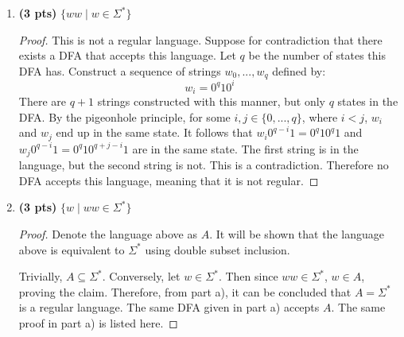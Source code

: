 \documentclass[11pt]{article}
\begin{document}
\begin{enumerate}[label=\textbf{Q\arabic*.}]
\begin{enumerate}[label=\textit{\alph*)}]
	\begin{proof}
		This is not regular. Suppose for contradiction that this language was regular. Then there would be a DFA associated with this language. Let \(q\) be the number of states in this DFA, and let \(q_0\) denote the initial state. Define the following strings:
		\[
			w_i = 0^q 1 0^{i} \text{, for } i \in \{0, 1, 2, ..., q\}
		\]
		Notice that there are \(q+1\) strings in total. By the pigeonhole principle, at least 2 \(w_i, w_j\) will be in the same state \(q_c\), \(i < j\), that is, \(\delta (q_0, w_i) = \delta (q_0, w_j) = q_c\). It follows that \(\delta (q_0, w_i 0^{q-i}) = \delta (q_0, w_j 0^{q-i})\). But notice that
		\[
			w_i = 0^q 1 0^q \text{ and } w_j = 0^q 1 0^{q+j-i} \text{.} 
		\]
		It can be seen that \(w_i\) is a palindrome and should be accepted, but because \(q + j - i \neq q\), \(w_j\) is not a palindrome, which contradicts the fact that \(w_i\) and \(w_j\) are in the same state.

	\end{proof}
	\item \textbf{(3 pts)} $ \{ww \mid w \in \Sigma^*  \} $
	
	\begin{proof}
		This is not a regular language. Suppose for contradiction that there exists a DFA that accepts this language. Let \(q\) be the number of states this DFA has. Construct a sequence of strings \(w_0, ..., w_q\) defined by:
		\[
			w_i = 0^q 1 0^i
		\]
		There are \(q + 1\) strings constructed with this manner, but only \(q\) states in the DFA. By the pigeonhole principle, for some \(i, j \in \{0, ..., q\}\), where \(i <j\), \(w_i\) and \(w_j\) end up in the same state. It follows that \(w_i 0^{q-i}1 = 0^q 1 0^q 1\) and \(w_j 0^{q-i}1 = 0^q 1 0^{q + j - i}1\) are in the same state. The first string is in the language, but the second string is not. This is a contradiction. Therefore no DFA accepts this language, meaning that it is not regular.
		\smallbreak
	\end{proof}

	\item \textbf{(3 pts)} $ \{w \mid ww \in \Sigma^*  \} $

	\begin{proof}
		Denote the language above as \(A\). It will be shown that the language above is equivalent to \(\Sigma ^*\) using double subset inclusion.

		Trivially, \(A \subseteq \Sigma ^*\). Conversely, let \(w \in \Sigma ^*\). Then since \(ww \in \Sigma ^*\), \(w \in A\), proving the claim. Therefore, from part a), it can be concluded that \(A = \Sigma ^*\) is a regular language. The same DFA given in part a) accepts \(A\). The same proof in part a) is listed here.


\end{proof}
\end{enumerate}
\end{enumerate}
\end{document}
